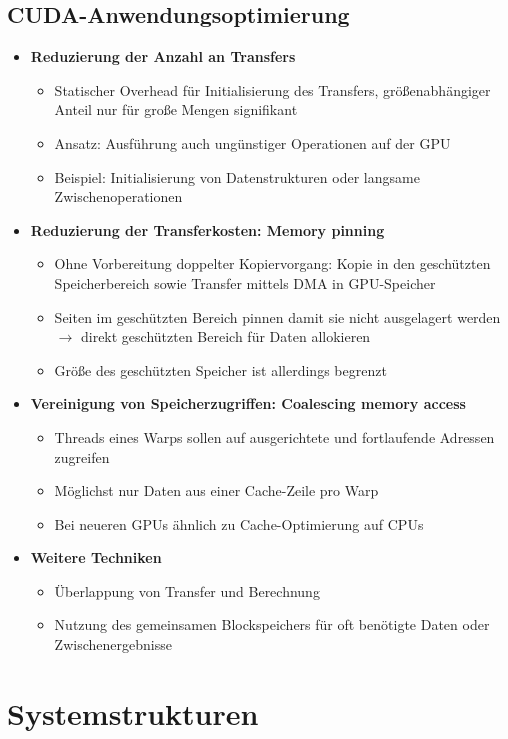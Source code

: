 \subsection{CUDA-Anwendungsoptimierung}
\begin{itemize}
	\item \textbf{Reduzierung der Anzahl an Transfers}
	\begin{itemize}
		\item Statischer Overhead für Initialisierung des Transfers, größenabhängiger Anteil nur für große Mengen signifikant
		\item Ansatz: Ausführung auch ungünstiger Operationen auf der GPU
		\item Beispiel: Initialisierung von Datenstrukturen oder langsame Zwischenoperationen
	\end{itemize}
	\item \textbf{Reduzierung der Transferkosten: Memory pinning}
	\begin{itemize}
		\item Ohne Vorbereitung doppelter Kopiervorgang: Kopie in den geschützten Speicherbereich sowie Transfer mittels DMA in GPU-Speicher
		\item Seiten im geschützten Bereich pinnen damit sie nicht ausgelagert werden \(\rightarrow\) direkt geschützten Bereich für Daten allokieren
		\item Größe des geschützten Speicher ist allerdings begrenzt
	\end{itemize}
	\item \textbf{Vereinigung von Speicherzugriffen: Coalescing memory access}
	\begin{itemize}
		\item Threads eines Warps sollen auf ausgerichtete und fortlaufende Adressen zugreifen
		\item Möglichst nur Daten aus einer Cache-Zeile pro Warp
		\item Bei neueren GPUs ähnlich zu Cache-Optimierung auf CPUs
	\end{itemize}
	\item \textbf{Weitere Techniken}
	\begin{itemize}
		\item Überlappung von Transfer und Berechnung
		\item Nutzung des gemeinsamen Blockspeichers für oft benötigte Daten oder Zwischenergebnisse
	\end{itemize}
\end{itemize}

\section{Systemstrukturen}
